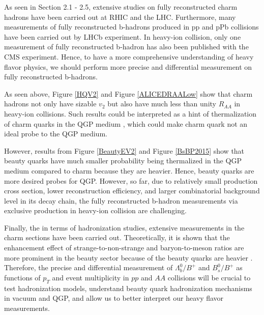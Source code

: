 As seen in Section 2.1 - 2.5, extensive studies on fully reconstructed charm hadrons have been carried out at RHIC and the LHC. Furthermore, many measurements of fully reconstructed b-hadrons produced in pp and pPb collisions have been carried out by LHCb experiment. In heavy-ion collision, only one measurement of fully reconstructed b-hadron has also been published with the CMS experiment. Hence, to have a more comprehensive understanding of heavy flavor physics, we should perform more precise and differential measurement on fully reconstructed b-hadrons. 


As seen above, Figure \ref{HQV2} and Figure \ref{ALICEDRAALow} show that charm hadrons not only have sizable $v_2$ but also have much less than unity $R_{AA}$ in heavy-ion collisions. Such results could be interpreted as a hint of thermalization of charm quarks in the QGP medium \cite{CharmThermal}, which could make charm quark not an ideal probe to the QGP medium. 

However, results from Figure \ref{BeautyEV2} and Figure \ref{BsBP2015} show that beauty quarks have much smaller probability being thermalized in the QGP medium compared to charm because they are heavier. Hence, beauty quarks are more desired probes for QGP. However, so far, due to relatively small production cross section, lower reconstruction efficiency, and larger combinatorial background level in its decay chain, the fully reconstructed b-hadron measurements via exclusive production in heavy-ion collision are challenging.

Finally, the in terms of hadronization studies, extensive measurements in the charm sections have been carried out. Theoretically, it is shown that the enhancement effect of strange-to-non-strange and baryon-to-meson ratios are more prominent in the beauty sector because of the beauty quarks are heavier \cite{BaryontoMeson}. Therefore, the precise and differential measurement of $\Lambda_b^0/B^+$ and $B^0_s/B^+$ as functions of $p_T$ and event multiplicity in $pp$ and $AA$ collisions will be crucial to test hadronization models, understand beauty quark hadronization mechanisms in vacuum and QGP, and allow us to better interpret our heavy flavor measurements.

